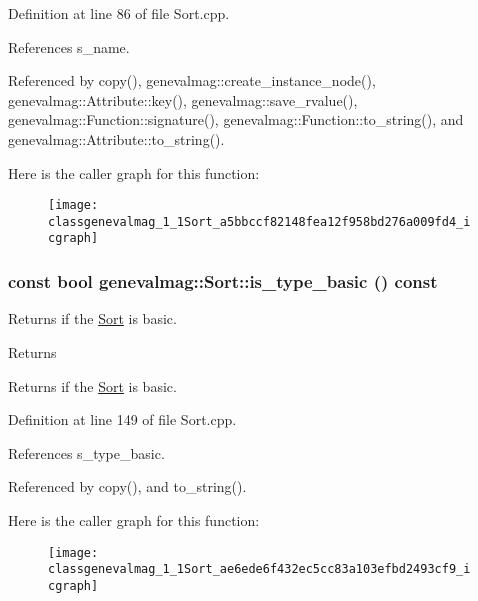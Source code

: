 Definition at line 86 of file Sort.cpp.



References s\_\-name.



Referenced by copy(), genevalmag::create\_\-instance\_\-node(), genevalmag::Attribute::key(), genevalmag::save\_\-rvalue(), genevalmag::Function::signature(), genevalmag::Function::to\_\-string(), and genevalmag::Attribute::to\_\-string().



Here is the caller graph for this function:\nopagebreak
\begin{figure}[H]
\begin{center}
\leavevmode
\texttt{[image: classgenevalmag\_1\_1Sort\_a5bbccf82148fea12f958bd276a009fd4\_icgraph]}
\end{center}
\end{figure}


\hypertarget{classgenevalmag_1_1Sort_ae6ede6f432ec5cc83a103efbd2493cf9}{
\subsubsection[{is\_\-type\_\-basic}]{\setlength{\rightskip}{0pt plus 5cm}const bool genevalmag::Sort::is\_\-type\_\-basic () const}}
\label{classgenevalmag_1_1Sort_ae6ede6f432ec5cc83a103efbd2493cf9}
Returns if the \hyperlink{classgenevalmag_1_1Sort}{Sort} is basic. \begin{DoxyReturn}{Returns}

\end{DoxyReturn}
Returns if the \hyperlink{classgenevalmag_1_1Sort}{Sort} is basic. 

Definition at line 149 of file Sort.cpp.



References s\_\-type\_\-basic.



Referenced by copy(), and to\_\-string().



Here is the caller graph for this function:\nopagebreak
\begin{figure}[H]
\begin{center}
\leavevmode
\texttt{[image: classgenevalmag\_1\_1Sort\_ae6ede6f432ec5cc83a103efbd2493cf9\_icgraph]}
\end{center}
\end{figure}


